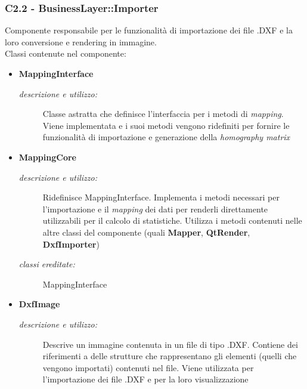 \subsubsection{C2.2 - BusinessLayer::Importer} \label{sec:c2.2}
Componente responsabile per le funzionalità di importazione dei file .DXF e la loro conversione e rendering in immagine. \\
Classi contenute nel componente: 
\begin{itemize} 
\item \textbf{MappingInterface}
\begin{description}
\item [\textit{descrizione e utilizzo:}] Classe astratta che definisce l'interfaccia per i metodi di \textit{mapping}. Viene implementata e i suoi metodi vengono ridefiniti per fornire le funzionalità di importazione e generazione della \textit{homography matrix}
\end{description}
\item \textbf{MappingCore}
\begin{description}
\item [\textit{descrizione e utilizzo:}] Ridefinisce MappingInterface. Implementa i metodi necessari per l'importazione e il \textit{mapping} dei dati per renderli direttamente utilizzabili per il calcolo di statistiche. Utilizza i metodi contenuti nelle altre classi del componente (quali \textbf{Mapper}, \textbf{QtRender}, \textbf{DxfImporter})
\item [\textit{classi ereditate:}] MappingInterface
\end{description}
\item \textbf{DxfImage}
\begin{description}
\item [\textit{descrizione e utilizzo:}] Descrive un immagine contenuta in un file di tipo .DXF. Contiene dei riferimenti a delle strutture che rappresentano gli elementi (quelli che vengono importati) contenuti nel file. Viene utilizzata per l'importazione dei file .DXF e per la loro visualizzazione


\end{description}
\end{itemize}
